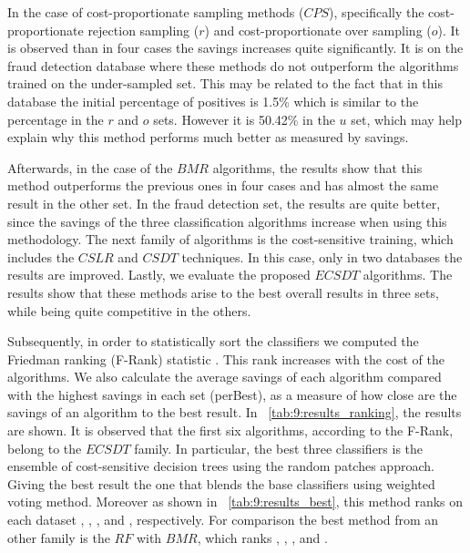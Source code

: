 {  In the case of cost-proportionate sampling methods ($CPS$), specifically the 
  cost-proportionate rejection sampling ($r$) and cost-proportionate over 
  sampling ($o$). It is observed than in four cases the savings increases quite 
  significantly. It is on the fraud detection database where these methods do not outperform the 
  algorithms trained on the under-sampled set. This may be related to the fact that in this 
  database the initial percentage of positives is 1.5\% which is similar to the percentage in the 
  $r$ and   $o$ sets. However it is 50.42\% in the $u$ set, which may help explain why this method 
  performs much better as measured by savings.

  Afterwards, in the case of the $BMR$ algorithms, the results show that this method outperforms 
  the previous ones in four cases and has almost the same result in the other set. In the fraud 
  detection  set, the results are quite better, since the savings of the three classification 
  algorithms increase when using this methodology. The next family of algorithms is the 
  cost-sensitive training, which includes the $CSLR$ and $CSDT$ techniques. In this case, only in 
  two databases the results are improved. Lastly, we evaluate the proposed $ECSDT$ algorithms. The 
  results show that these methods arise to the best overall results in three sets, while being 
  quite competitive in the others.
  
  Subsequently, in order to statistically sort the classifiers we computed the Friedman ranking 
  (F-Rank)  statistic \citep{Demsar2006}. This rank increases with the cost of the algorithms. 
  We also calculate the average savings of each algorithm compared with the highest savings in 
  each set (perBest), as a  measure of how close are the savings of an algorithm to the best 
result. 
  In \tablename{~\ref{tab:9:results_ranking}}, the results are shown. It is observed that  the 
  first six algorithms, according to the F-Rank, belong to the $ECSDT$ family. In particular, the 
  best three classifiers is the ensemble of cost-sensitive decision trees using the random patches 
  approach. Giving the best result the one that blends the base classifiers using weighted voting 
  method. Moreover as shown in  \tablename{~\ref{tab:9:results_best}}, this method ranks on each 
  dataset , , ,  and , respectively. For comparison the best 
  method from an other family is the $RF$ with $BMR$, which ranks , , , 
   and .
  
}
